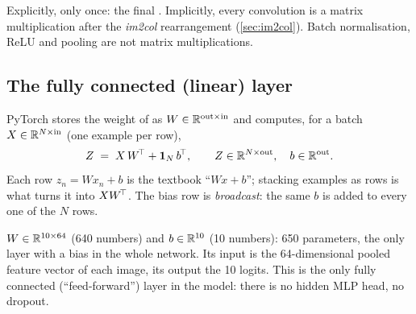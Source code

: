 \begin{repo}
Explicitly, only once: the final . Implicitly, every convolution is a matrix multiplication after the \emph{im2col} rearrangement (\cref{sec:im2col}). Batch normalisation, ReLU and pooling are not matrix multiplications.
\end{repo}

\subsection{The fully connected (linear) layer}
\label{sec:linear}

\begin{idea}
PyTorch stores the weight of  as $W\in\mathbb{R}^{\text{out}\times\text{in}}$ and computes, for a batch $X\in\mathbb{R}^{N\times\text{in}}$ (one example per row),
\[
  Z \;=\; X\,W^{\!\top} + \mathbf{1}_N\, b^{\!\top}, \qquad Z\in\mathbb{R}^{N\times\text{out}}, \quad b\in\mathbb{R}^{\text{out}} .
\]
Each row $z_n = W x_n + b$ is the textbook ``$Wx+b$''; stacking examples as rows is what turns it into $XW^{\!\top}$. The bias row is \emph{broadcast}: the same $b$ is added to every one of the $N$ rows.
\end{idea}

\begin{center}
\end{center}

\begin{repo}[\texttt{self.linear = nn.Linear(64, 10)}]
$W\in\mathbb{R}^{10\times 64}$ (640 numbers) and $b\in\mathbb{R}^{10}$ (10 numbers): 650 parameters, the only layer with a bias in the whole network. Its input is the 64-dimensional pooled feature vector of each image, its output the 10 logits. This is the only fully connected (``feed-forward'') layer in the model: there is no hidden MLP head, no dropout.
\end{repo}


